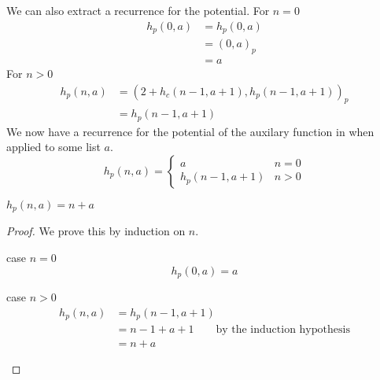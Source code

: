 We can also extract a recurrence for the potential.
For $n=0$
%
\begin{align*}
h_p(0,a) &= h_p(0,a) \\
         &= (0, a)_p \\
         &= a
\end{align*}
%
For $n>0$
%
\begin{align*}
  h_p(n,a) &= (2 + h_c(n-1,a+1), h_p(n-1,a+1))_p \\
           &= h_p(n-1,a+1)
\end{align*}
%
We now have a recurrence for the potential of the auxilary function in
 when applied to some list $a$.
%
\begin{equation}
  h_p(n,a) = \begin{cases}
    a & n = 0 \\
    h_p(n-1,a+1) & n > 0
  \end{cases}
\end{equation}
%
\begin{theorem}
  \label{lem:fr_interp_h_potential}
  $h_p(n,a) = n + a$
\end{theorem}
%
\begin{proof}
  We prove this by induction on $n$.
  \begin{description}
    \item{case $n=0$}\hfill \\
      \[ h_p(0,a) = a \]
    \item{case $n>0$}\hfill \\
      \begin{align*}
      h_p(n,a) &= h_p(n-1,a+1) \\
               &= n - 1 + a + 1  \qquad \text{by the induction hypothesis} \\
               &= n + a
      \end{align*}
  \end{description}
\end{proof}
%


